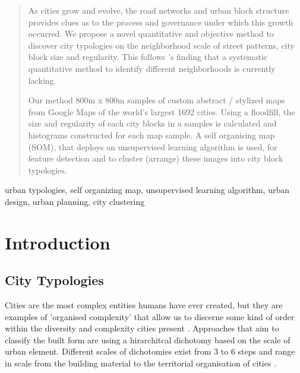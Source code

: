 \documentclass[final,3p,times,authoryear]{elsarticle}
\begin{document}
\begin{frontmatter}
\begin{abstract}
As cities grow and evolve, the road networks and urban block structure provides clues as to the process and governance under which this growth occurred. We propose a novel quantitative and objective method to discover city typologies on the neighborhood scale of street patterns, city block size and regularity. This follows \cite{Louf2014a}'s finding that a systematic quantitative method to identify different neighborhoods is currently lacking. 

Our method 800m x 800m samples of custom abstract / stylized maps from Google Maps of the world's largest 1692 cities. Using a floodfill, the size and regularity of each city blocks in a samples is calculated and histograms constructed for each map sample. A self organising map (SOM), that deploys an unsupervised learning algorithm is used, for feature detection and to cluster (arrange) these images into city block typologies. 


\end{abstract}

\begin{keyword}
urban typologies, self organizing map, unsupervised learning algorithm, urban design, urban planning, city clustering



\end{keyword}

\end{frontmatter}







\section{Introduction}\label{sec:introduction}


\subsection{City Typologies}\label{sec:introduction2}
Cities are the most complex entities humans have ever created, but they are examples of 'organised complexity' that allow us to discerne some kind of order within the diversity and complexity cities present \citep{Kropf2014}. Approaches that aim to classify the built form are using a hirarchitcal dichotomy based on the scale of urban element. Different scales of dichotomies exist from 3 to 6 steps and range in scale from the building material to the territorial organisation of cities  \citep{Lynch1981} \citep{Conzen1960} \citep{Caniggi1979} \citep{Castex1980} \citep{Mouden1988} \citep{Allain2004}.
\end{document}
